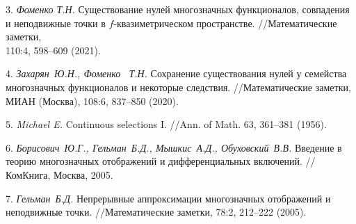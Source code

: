 3.
{\it Фоменко Т.Н.} Существование нулей многозначных фу\-нкционалов, совпадения и неподвижные точки в $f$-ква\-зи\-мет\-ри\-чес\-ком пространстве. //Математические заметки, \\110:4, 598--609 (2021).

4.
{\it Захарян~Ю.Н., Фоменко ~Т.Н.}  Сохранение существования нулей у семейства многозначных функционалов и некоторые следствия. //Математические заметки, МИАН (Мос\-ква), 108:6, 837--850 (2020).


5.
{\it Michael E. } Continuous selections I. //Ann. of Math. 63, 361--381 (1956).


6.
{\it Борисович~Ю.Г., Гельман~Б.Д., Мышкис~А.Д., Обухов\-ский~В.В.}
Введение в теорию многозначных отображений и дифференциальных включений. //КомКнига, Москва, 2005.

7.
{\it Гельман~Б.Д.} Непрерывные аппроксимации многозначных отображений и неподвижные точки. //Математические заметки,  78:2, 212--222 (2005).
